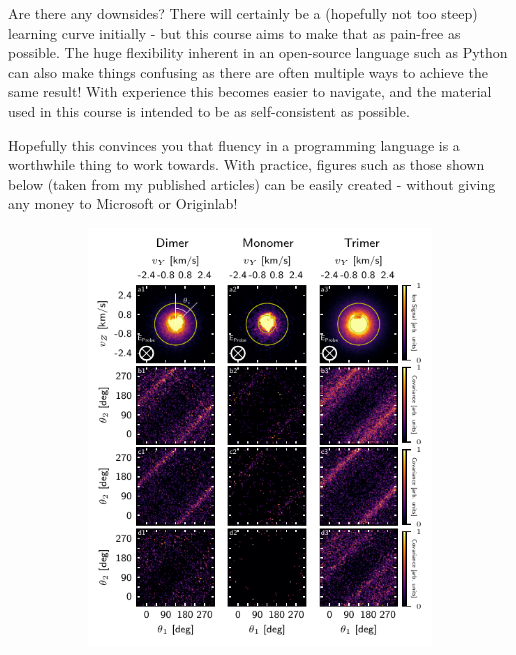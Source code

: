 \documentclass[10pt,a4paper]{memoir}
\begin{document}
Are there any downsides? There will certainly be a (hopefully not too steep) learning curve initially - but this course aims to make that as pain-free as possible. The huge flexibility inherent in an open-source language such as Python can also make things confusing as there are often multiple ways to achieve the same result! With experience this becomes easier to navigate, and the material used in this course is intended to be as self-consistent as possible. 

Hopefully this convinces you that fluency in a programming language is a worthwhile thing to work towards. With practice, figures such as those shown below (taken from my published articles) can be easily created - without giving any money to Microsoft or Originlab! 
\begin{figure}[h]
\centering
	\begin{subfigure}[b]{0.45\textwidth}
		\includegraphics[width=\textwidth]{example_fig1.pdf}
	\end{subfigure}
	\quad
	\begin{subfigure}[b]{0.35\textwidth}

\end{subfigure}
\end{figure}
\end{document}
